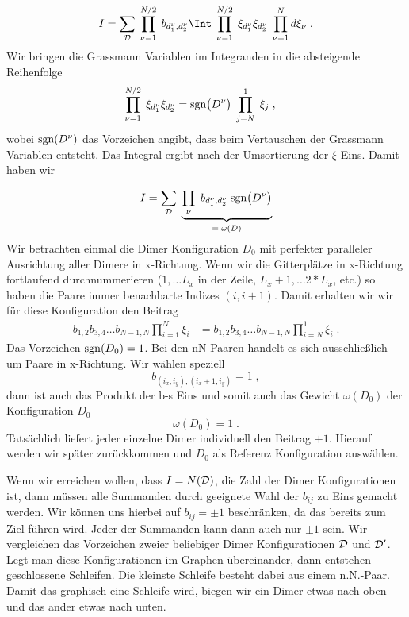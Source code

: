 \begin{align}\label{eq:gv3}
    I =  \sum_{\cal D}\; \prod_{\nu=1}^{N/2}\;b_{d^\nu_1,d^\nu_2} \Int \; \prod_{\nu=1}^{N/2}\;\xi_{d^\nu_1}\xi_{d^\nu_2}\;\prod_{\nu=1}^N d\xi_\nu\;.
\end{align}
Wir bringen die Grassmann Variablen im Integranden in die absteigende Reihenfolge 
\begin{align}\label{eq:gv2}
    \prod_{\nu=1}^{N/2}\;\xi_{d^\nu_1}\xi_{d^\nu_2} &= 
    {\rm sgn}\big(D^\nu\big)\;\prod_{j=N}^1\;\xi_j\;,
\end{align}
wobei ${\rm sgn}(D^\nu)$ das Vorzeichen angibt, dass beim Vertauschen der Grassmann Variablen entsteht. Das Integral ergibt nach der Umsortierung der
$\xi$ Eins. Damit haben wir

\begin{align*}
    I =  \sum_{\cal D}\; \underbrace{\prod_{\nu}\;b_{d^\nu_1,d^\nu_2} \;{\rm sgn}\big(D^\nu\big)}_{=:\omega(D)}
\end{align*}
Wir betrachten einmal die Dimer Konfiguration $D_0$ mit perfekter paralleler Ausrichtung aller Dimere in x-Richtung. Wenn wir die Gitterplätze in x-Richtung fortlaufend
durchnummerieren ($1,\ldots L_x$ in der  Zeile, $L_x+1,\ldots 2*L_x$, etc.) so haben die Paare immer benachbarte Indizes $(i,i+1)$. Damit erhalten wir wir für diese
Konfiguration den Beitrag
\begin{align*}
    b_{1,2} b_{3,4}\ldots b_{N-1,N} \prod_{i=1}^N \xi_i &=
    b_{1,2} b_{3,4}\ldots b_{N-1,N} \prod_{i=N}^1 \xi_i\;.
\end{align*}
Das Vorzeichen ${\rm sgn}(D_0)=1$. Bei den nN Paaren handelt es sich ausschließlich um Paare in x-Richtung. Wir wählen speziell
\begin{equation}\label{eq:gv_b}
    b_{(i_x,i_y),(i_x+1,i_y)} = 1\;,
\end{equation}
dann ist auch das Produkt der b-s Eins und somit auch das Gewicht $\omega(D_0)$ der Konfiguration $D_0$
\begin{equation}\label{eq:gv_d0}
    \omega(D_0) = 1\;.
\end{equation}
Tatsächlich liefert jeder einzelne Dimer individuell den Beitrag $+1$. Hierauf werden wir später zurückkommen und $D_0$ als Referenz Konfiguration auswählen.

Wenn wir erreichen wollen, dass $I=N({\cal D})$, die Zahl der Dimer Konfigurationen ist, dann müssen alle Summanden durch geeignete Wahl der $b_{ij}$
zu Eins gemacht werden. Wir können uns hierbei auf $b_{ij}=\pm 1$ beschränken, da das bereits zum Ziel führen wird.
Jeder der Summanden kann dann auch nur $\pm 1$ sein. Wir vergleichen das Vorzeichen zweier beliebiger Dimer Konfigurationen ${\cal D}$ und ${\cal D}'$.
Legt man diese Konfigurationen im Graphen übereinander, dann entstehen geschlossene Schleifen. Die kleinste Schleife besteht dabei aus einem n.N.-Paar.
Damit das graphisch eine Schleife wird, biegen wir ein Dimer etwas nach oben und das ander etwas nach unten.

